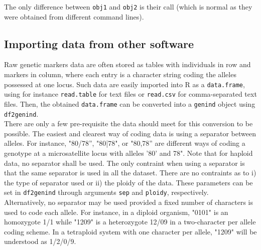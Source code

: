 \documentclass{article}
\begin{document}
\noindent The only difference between \texttt{obj1} and \texttt{obj2} is
their call (which is normal as they were obtained from different
command lines).




\subsection{Importing data from other software}
Raw genetic markers data are often stored as tables with individuals in row and markers
in column, where each entry is a character string coding the alleles possessed at one locus.
Such data are easily imported into R as a \texttt{data.frame}, using for instance \texttt{read.table}
for text files or \texttt{read.csv} for comma-separated text files.
Then, the obtained \texttt{data.frame} can be converted into a \texttt{genind} object using \texttt{df2genind}.
\\

There are only a few pre-requisite the data should meet for this conversion to be possible. The
easiest and clearest way of coding data is using a separator between alleles. For instance,
"80/78'', "80|78", or "80,78'' are different ways of coding a genotype at a microsatellite locus
with alleles '80' and 78".
Note that for haploid data, no separator shall be used.
The only contraint when using a separator is that the same separator is used in all the
dataset. There are no contraints as to i) the type of separator used or ii) the ploidy of the data.
These parameters can be set in \texttt{df2genind} through arguments \texttt{sep} and \texttt{ploidy}, respectively.
\\

Alternatively, no separator may be used provided a fixed number of characters is used to code each allele.
For instance, in a diploid organism, "0101" is an homozygote 1/1 while "1209" is a heterozygote
12/09 in a two-character per allele coding scheme.
In a tetraploid system with one character per allele, "1209" will be understood as 1/2/0/9.
\end{document}
